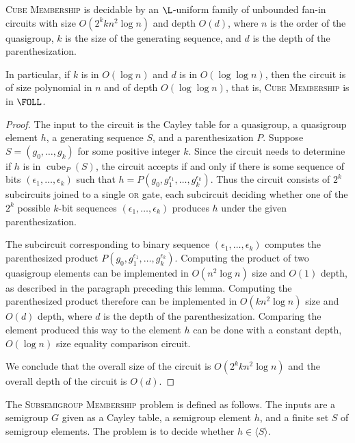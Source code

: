 \documentclass{article}
\newcommand{\gen}[1]{\langle #1 \rangle}
\DeclareMathOperator{\cube}{cube}
\begin{document}
\begin{lemma}\label{lem:cubemem}
  \textsc{Cube Membership} is decidable by an $\L$-uniform family of unbounded fan-in circuits with size $O(2^k k n^2 \log n)$ and depth $O(d)$, where $n$ is the order of the quasigroup, $k$ is the size of the generating sequence, and $d$ is the depth of the parenthesization.

  In particular, if $k$ is in $O(\log n)$ and $d$ is in $O(\log \log n)$, then the circuit is of size polynomial in $n$ and of depth $O(\log \log n)$, that is, \textsc{Cube Membership} is in $\FOLL$.
\end{lemma}
\begin{proof}
  The input to the circuit is the Cayley table for a quasigroup, a quasigroup element $h$, a generating sequence $S$, and a parenthesization $P$.
  Suppose $S = (g_0, \dotsc, g_k)$ for some positive integer $k$.
  Since the circuit needs to determine if $h$ is in $\cube_P(S)$, the circuit accepts if and only if there is some sequence of bits $(\epsilon_1, \dotsc, \epsilon_k)$ such that $h = P(g_0, g_1^{\epsilon_1}, \dotsc, g_k^{\epsilon_k})$.
  Thus the circuit consists of $2^k$ subcircuits joined to a single \textsc{or} gate, each subcircuit deciding whether one of the $2^k$ possible $k$-bit sequences $(\epsilon_1, \dotsc, \epsilon_k)$ produces $h$ under the given parenthesization.

  The subcircuit corresponding to binary sequence $(\epsilon_1, \dotsc, \epsilon_k)$ computes the parenthesized product $P(g_0, g_1^{\epsilon_1}, \dotsc, g_k^{\epsilon_k})$.
  Computing the product of two quasigroup elements can be implemented in $O(n^2 \log n)$ size and $O(1)$ depth, as described in the paragraph preceding this lemma.
  Computing the parenthesized product therefore can be implemented in $O(k n^2 \log n)$ size and $O(d)$ depth, where $d$ is the depth of the parenthesization.
  Comparing the element produced this way to the element $h$ can be done with a constant depth, $O(\log n)$ size equality comparison circuit.

  We conclude that the overall size of the circuit is $O(2^k k n^2 \log n)$ and the overall depth of the circuit is $O(d)$.
\end{proof}

The \textsc{Subsemigroup Membership} problem is defined as follows.
The inputs are a semigroup $G$ given as a Cayley table, a semigroup element $h$, and a finite set $S$ of semigroup elements.
The problem is to decide whether $h \in \gen{S}$.
\end{document}
